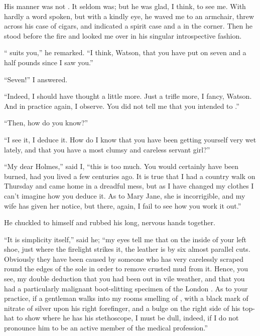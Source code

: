 \documentclass{fiche}
\begin{document}
\begin{texte}
His manner was not . It seldom was; but he was glad, I
think, to see me. With hardly a word spoken, but with a kindly eye, he waved me to an
armchair, threw across his case of cigars, and indicated a spirit case and a
 in the corner. Then he stood before the
fire and looked me over in his singular introspective fashion.

`` suits you,'' he remarked. ``I think, Watson, that you
have put on seven and a half pounds since I saw you.''

``Seven!'' I answered.

``Indeed, I should have thought a little more. Just a trifle more, I fancy, Watson. And in
practice again, I observe. You did not tell me that you intended to
.''

``Then, how do you know?''

``I see it, I deduce it. How do I know that you have been getting yourself very wet lately,
and that you have a most clumsy and careless servant girl?''

``My dear Holmes,'' said I, ``this is too much. You would certainly have been burned, had you
lived a few centuries ago. It is true that I had a country walk on Thursday and came home in
a dreadful mess, but as I have changed my clothes I can't imagine how you deduce it. As to
Mary Jane, she is incorrigible, and my wife has given her notice, but there, again, I fail to
see how you work it out.''

He chuckled to himself and rubbed his long, nervous hands together.

``It is simplicity itself,'' said he; ``my eyes tell me that on the inside of your left shoe,
just where the firelight strikes it, the leather is  by six almost parallel cuts. Obviously they have been caused by someone who has very
carelessly scraped round the edges of the sole in order to remove crusted mud from it. Hence,
you see, my double deduction that you had been out in vile weather, and that you had a
particularly malignant boot-slitting specimen of the London
. As to your practice, if a gentleman walks
into my rooms smelling of , with a black
mark of nitrate of silver upon his right forefinger, and a bulge on the right side of his
top-hat to show where he has  his stethoscope, I must be
dull, indeed, if I do not pronounce him to be an active member of the medical profession.''
\end{texte}
\end{document}
